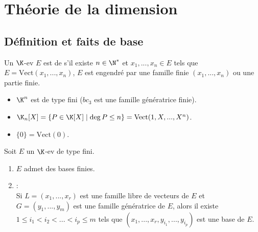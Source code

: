 \documentclass[12pt, a4paper]{report}
\begin{document}
\chapter{Théorie de la dimension}
\sommaire

\section{Définition et faits de base}

\begin{definition}{}{}
Un $\K$-ev $E$ est de  s'il existe $n \in \N^*$ et $x_1,...,x_n \in E$ tels que $E = \text{Vect}(x_1,...,x_n)$, \ie $E$ est engendré par une famille finie $(x_1,...,x_n)$ ou une partie finie.
\end{definition}

\begin{exemple}[Exemples]{}
\begin{itemize}
	\item $\K^n$ est de type fini ($bc_3$ est une famille génératrice finie).
	\item $\K_n[X] = \{ P \in \K[X] \mid \deg P \le n \} = \text{Vect}(1,X,...,X^n)$.
	\item $\{0\} = \text{Vect}(0)$.
\end{itemize}
\end{exemple}

\begin{theoreme}{}{}
Soit $E$ un $\K$-ev de type fini.
\begin{enumerate}
	\item $E$ admet des bases finies.
	\item {} : \\
	Si $L = (x_1,...,x_r)$ est une famille libre de vecteurs de $E$ et $G = (y_1,...,y_m)$ est une famille génératrice de $E$, alors il existe $1 \le i_1 < i_2 < ... < i_p \le m$ tels que $(x_1,...,x_r,y_{i_1},...,y_{i_p})$ est une base de $E$.
\end{enumerate}
\end{theoreme}
\end{document}
